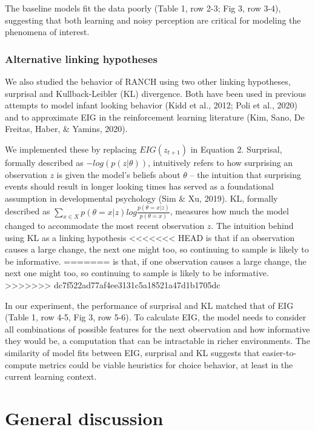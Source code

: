 \documentclass[10pt, letterpaper]{article}
\begin{document}
The baseline models fit the data poorly (Table 1, row 2-3; Fig 3, row
3-4), suggesting that both learning and noisy perception are critical
for modeling the phenomena of interest. \smallbreak

\hypertarget{alternative-linking-hypotheses}{%
\subsubsection{Alternative linking
hypotheses}\label{alternative-linking-hypotheses}}

We also studied the behavior of RANCH using two other linking
hypotheses, surprisal and Kullback-Leibler (KL) divergence. Both have
been used in previous attempts to model infant looking behavior (Kidd et
al., 2012; Poli et al., 2020) and to approximate EIG in the
reinforcement learning literature (Kim, Sano, De Freitas, Haber, \&
Yamins, 2020).

We implemented these by replacing \(EIG(z_{t+1})\) in Equation 2.
Surprisal, formally described as \(-log(p(z|\theta))\), intuitively
refers to how surprising an observation \(z\) is given the model's
beliefs about \(\theta\) -- the intuition that surprising events should
result in longer looking times has served as a foundational assumption
in developmental psychology (Sim \& Xu, 2019). KL, formally described as
\(\sum_{x \in X}{p(\theta = x|z) log \frac{p(\theta = x|z)}{p(\theta = x)}}\),
measures how much the model changed to accommodate the most recent
observation \(z\). The intuition behind using KL as a linking hypothesis
<<<<<<< HEAD
is that if an observation causes a large change, the next one might too,
so continuing to sample is likely to be informative.
=======
is that, if one observation causes a large change, the next one might
too, so continuing to sample is likely to be informative.
>>>>>>> dc7f522ad77af4ee3131c5a18521a47d1b1705dc

In our experiment, the performance of surprisal and KL matched that of
EIG (Table 1, row 4-5, Fig 3, row 5-6). To calculate EIG, the model
needs to consider all combinations of possible features for the next
observation and how informative they would be, a computation that can be
intractable in richer environments. The similarity of model fits between
EIG, surprisal and KL suggests that easier-to-compute metrics could be
viable heuristics for choice behavior, at least in the current learning
context.

\hypertarget{general-discussion}{%
\section{General discussion}\label{general-discussion}}
\end{document}
